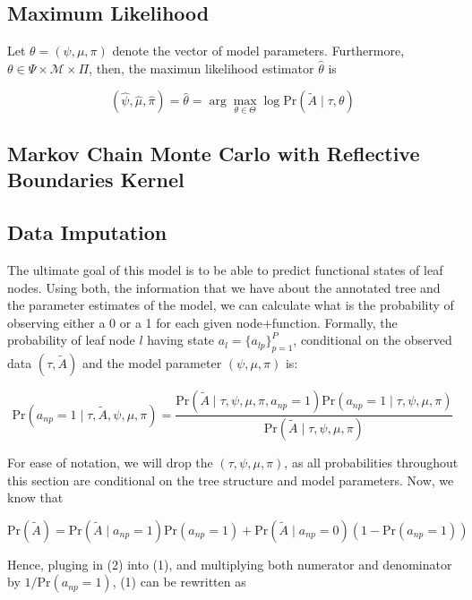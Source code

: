 \documentclass{article}
\renewcommand{\Pr}[1]{{\mbox{Pr}\left(#1\right) }}
\newcommand{\Prcond}[2]{{\mbox{Pr}\left(#1\;|\;#2\right) }}
\begin{document}
\subsection{Maximum Likelihood}

Let $\theta = (\psi, \mu, \pi)$ denote the vector of model parameters. Furthermore, $\theta \in \Psi\times \mathcal{M} \times \Pi$, then, the maximun likelihood estimator $\hat \theta$ is

$$
(\hat \psi, \hat \mu, \hat \pi) = \hat\theta = \arg \max_{\theta \in \Theta} \log \Prcond{\tilde A}{\tau, \theta}
$$


\subsection{Markov Chain Monte Carlo with Reflective Boundaries Kernel}

\subsection{Data Imputation}

The ultimate goal of this model is to be able to predict functional states of leaf nodes. Using both, the information that we have about the annotated tree and the parameter estimates of the model, we can calculate what is the probability of observing either a 0 or a 1 for each given node+function. Formally, the probability of leaf node $l$ having state $a_l = \{a_{lp}\}_{p=1}^P$, conditional on the observed data $(\tau, \tilde A)$ and the model parameter $(\psi, \mu, \pi)$ is:

\begin{equation}
\Prcond{a_{np} = 1}{\tau, \tilde A, \psi, \mu, \pi} = \frac{\Prcond{\tilde A}{\tau, \psi, \mu, \pi, a_{np} = 1} \Prcond{a_{np}=1}{\tau, \psi, \mu, \pi}}{
\Prcond{\tilde A}{\tau, \psi, \mu, \pi}
}
\end{equation}

For ease of notation, we will drop the $(\tau, \psi, \mu, \pi)$, as all probabilities throughout this section are conditional on the tree structure and model parameters. Now, we know that

\begin{equation}
\label{eq:2}
\Pr{\tilde A} = \Prcond{\tilde A}{a_{np} = 1} \Pr{a_{np} = 1} + \Prcond{\tilde A}{a_{np} = 0} (1 - \Pr{a_{np} = 1})
\end{equation}

Hence, pluging in (2) into (1), and multiplying both numerator and denominator by $1/\Pr{a_{np} = 1}$, (1) can be rewritten as
\end{document}
